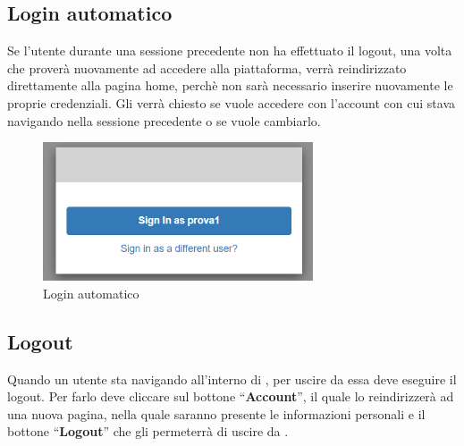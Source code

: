 {    \subsection{Login automatico} {
        Se l'utente durante una sessione precedente non ha effettuato il logout, una volta che proverà nuovamente ad accedere alla piattaforma,  
         verrà reindirizzato direttamente alla pagina home, perchè non sarà necessario inserire nuovamente le proprie credenziali. 
         Gli verrà chiesto se vuole accedere con l'account con cui stava navigando nella sessione precedente o se vuole cambiarlo.
         \begin{figure}[H]
            \includegraphics[width=8cm]{sezioni/images/login-auto.png}
            \centering
            \caption{Login automatico}
        \end{figure}
    }
    
    \subsection{Logout} {
        Quando un utente sta navigando all'interno di \platform, per uscire da essa deve eseguire il logout. Per farlo deve cliccare sul bottone ``\textbf{Account}'', il quale lo reindirizzerà ad una nuova pagina,
        nella quale saranno presente le informazioni personali e il bottone ``\textbf{Logout}'' che gli permeterrà di uscire da \platform. 
          
    }




}
